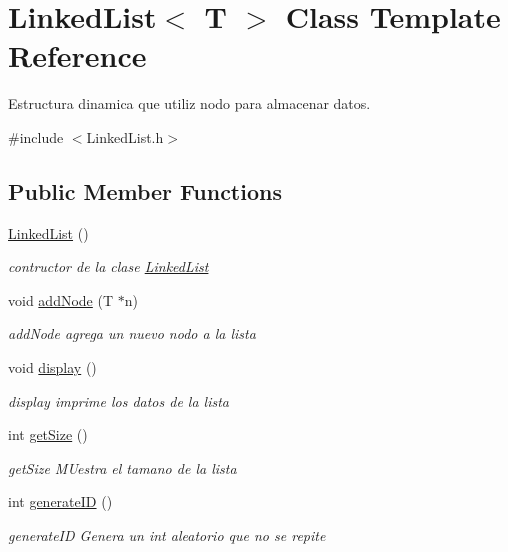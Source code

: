 \hypertarget{class_linked_list}{}\section{Linked\+List$<$ T $>$ Class Template Reference}
\label{class_linked_list}


Estructura dinamica que utiliz nodo para almacenar datos.  




{\ttfamily \#include $<$Linked\+List.\+h$>$}

\subsection*{Public Member Functions}
\begin{DoxyCompactItemize}
\item 
\hyperlink{class_linked_list_a3c20fcfec867e867f541061a09fc640c}{Linked\+List} ()
\begin{DoxyCompactList}\small\item\em contructor de la clase \hyperlink{class_linked_list}{Linked\+List} \end{DoxyCompactList}\item 
void \hyperlink{class_linked_list_ad4624e0abf07930148dbc6d01fa72e46}{add\+Node} (T $\ast$n)
\begin{DoxyCompactList}\small\item\em add\+Node agrega un nuevo nodo a la lista \end{DoxyCompactList}\item 
void \hyperlink{class_linked_list_ab43bd594a0f7f9ff21c96370da575693}{display} ()
\begin{DoxyCompactList}\small\item\em display imprime los datos de la lista \end{DoxyCompactList}\item 
int \hyperlink{class_linked_list_ab56d59b74c8d24cd223a4a49a2b5cfb1}{get\+Size} ()
\begin{DoxyCompactList}\small\item\em get\+Size M\+Uestra el tamano de la lista \end{DoxyCompactList}\item 
int \hyperlink{class_linked_list_a0132c7cb9ac724af205c892281e8303f}{generate\+ID} ()
\begin{DoxyCompactList}\small\item\em generate\+ID Genera un int aleatorio que no se repite \end{DoxyCompactList}\item 

\end{DoxyCompactItemize}
